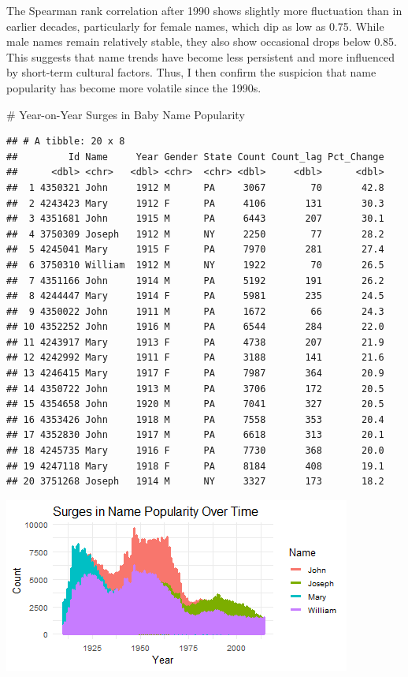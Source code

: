 \documentclass[11pt,preprint]{elsarticle}
\let\origfigure\figure
\let\endorigfigure\endfigure
\renewenvironment{figure}[1][2] {
    \expandafter\origfigure\expandafter[H]
} {
    \endorigfigure
}
\numberwithin{equation}{section}
\numberwithin{figure}{section}
\numberwithin{table}{section}
\begin{document}
The Spearman rank correlation after 1990 shows slightly more fluctuation
than in earlier decades, particularly for female names, which dip as low
as 0.75. While male names remain relatively stable, they also show
occasional drops below 0.85. This suggests that name trends have become
less persistent and more influenced by short-term cultural factors.
Thus, I then confirm the suspicion that name popularity has become more
volatile since the 1990s.

\# Year-on-Year Surges in Baby Name Popularity

\begin{verbatim}
## # A tibble: 20 x 8
##         Id Name     Year Gender State Count Count_lag Pct_Change
##      <dbl> <chr>   <dbl> <chr>  <chr> <dbl>     <dbl>      <dbl>
##  1 4350321 John     1912 M      PA     3067        70       42.8
##  2 4243423 Mary     1912 F      PA     4106       131       30.3
##  3 4351681 John     1915 M      PA     6443       207       30.1
##  4 3750309 Joseph   1912 M      NY     2250        77       28.2
##  5 4245041 Mary     1915 F      PA     7970       281       27.4
##  6 3750310 William  1912 M      NY     1922        70       26.5
##  7 4351166 John     1914 M      PA     5192       191       26.2
##  8 4244447 Mary     1914 F      PA     5981       235       24.5
##  9 4350022 John     1911 M      PA     1672        66       24.3
## 10 4352252 John     1916 M      PA     6544       284       22.0
## 11 4243917 Mary     1913 F      PA     4738       207       21.9
## 12 4242992 Mary     1911 F      PA     3188       141       21.6
## 13 4246415 Mary     1917 F      PA     7987       364       20.9
## 14 4350722 John     1913 M      PA     3706       172       20.5
## 15 4354658 John     1920 M      PA     7041       327       20.5
## 16 4353426 John     1918 M      PA     7558       353       20.4
## 17 4352830 John     1917 M      PA     6618       313       20.1
## 18 4245735 Mary     1916 F      PA     7730       368       20.0
## 19 4247118 Mary     1918 F      PA     8184       408       19.1
## 20 3751268 Joseph   1914 M      NY     3327       173       18.2
\end{verbatim}

\begin{figure}[H]

{\centering \includegraphics{23034103_Q1USbabynames_files/figure-latex/Figure 2a-1}

}

\caption{Caption Here \label{Figure1}}\label{fig:Figure 2a}
\end{figure}
\end{document}
